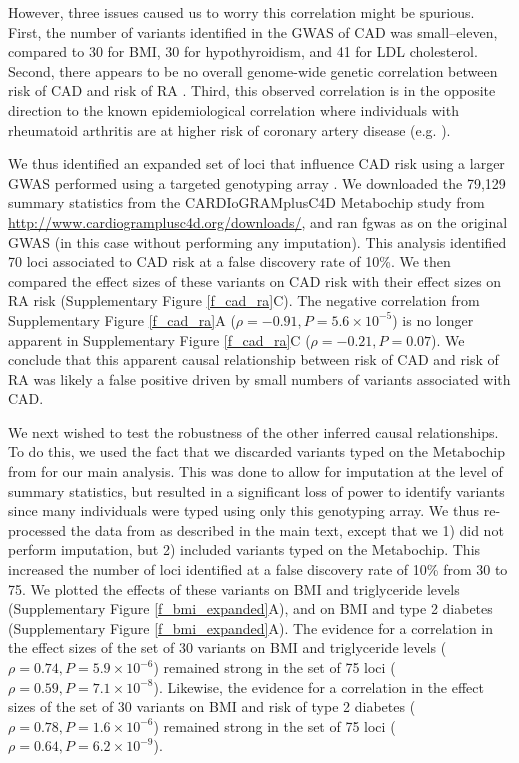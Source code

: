 \documentclass[11pt,titlepage]{article}
\begin{document}
However, three issues caused us to worry this correlation might be spurious. First, the number of variants identified in the GWAS of CAD was small--eleven, compared to 30 for BMI, 30 for hypothyroidism, and 41 for LDL cholesterol. Second, there appears to be no overall genome-wide genetic correlation between risk of CAD and risk of RA \citep{bulik2015atlas}. Third, this observed correlation is in the opposite direction to the known epidemiological correlation where individuals with rheumatoid arthritis are at higher risk of coronary artery disease (e.g. \citet{Maradit-Kremers:2005aa}). 

We thus identified an expanded set of loci that influence CAD risk using a larger GWAS performed using a targeted genotyping array \citep{CARDIoGRAMplusC4D-Consortium:2013aa}. We downloaded the 79,129 summary statistics from the CARDIoGRAMplusC4D Metabochip study \citep{CARDIoGRAMplusC4D-Consortium:2013aa} from \url{http://www.cardiogramplusc4d.org/downloads/}, and ran fgwas as on the original GWAS (in this case without performing any imputation). This analysis identified 70 loci associated to CAD risk at a false discovery rate of 10\%. We then compared the effect sizes of these variants on CAD risk with their effect sizes on RA risk (Supplementary Figure \ref{f_cad_ra}C). The negative correlation from Supplementary Figure \ref{f_cad_ra}A ($\rho = -0.91, P = 5.6 \times 10^{-5}$) is no longer apparent in Supplementary Figure \ref{f_cad_ra}C ($\rho = -0.21, P = 0.07$). We conclude that this apparent causal relationship between risk of CAD and risk of RA was likely a false positive driven by small numbers of variants associated with CAD. 

We next wished to test the robustness of the other inferred causal relationships. To do this, we used the fact that we discarded variants typed on the Metabochip from \citet{Locke:2015aa} for our main analysis. This was done to allow for imputation at the level of summary statistics, but resulted in a significant loss of power to identify variants since many individuals were typed using only this genotyping array. We thus re-processed the data from \citet{Locke:2015aa} as described in the main text, except that we 1) did not perform imputation, but 2) included variants typed on the Metabochip. This increased the number of loci identified at a false discovery rate of 10\% from 30 to 75. We plotted the effects of these variants on BMI and triglyceride levels (Supplementary Figure \ref{f_bmi_expanded}A), and on BMI and type 2 diabetes (Supplementary Figure \ref{f_bmi_expanded}A). The evidence for a correlation in the effect sizes of the set of 30 variants on BMI and triglyceride levels ($\rho =  0.74, P = 5.9 \times 10^{-6}$) remained strong in the set of 75 loci ($\rho = 0.59, P = 7.1 \times 10^{-8}$). Likewise, the evidence for a correlation in the effect sizes of the set of 30 variants on BMI and risk of type 2 diabetes ($\rho = 0.78, P = 1.6 \times 10^{-6}$) remained strong in the set of 75 loci ($\rho = 0.64, P = 6.2 \times 10^{-9}$). 
\end{document}
